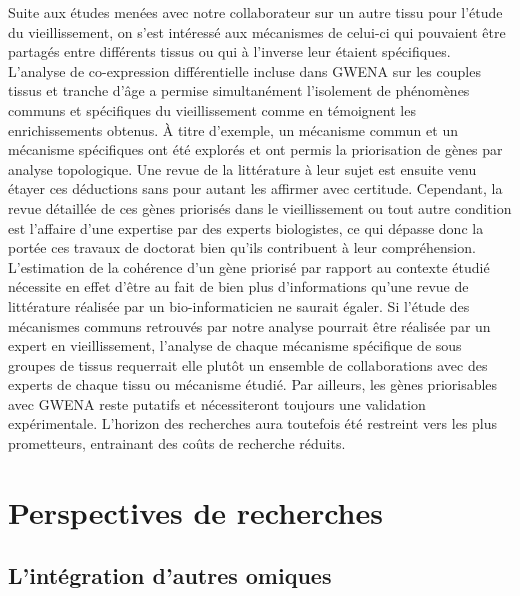 Suite aux études menées avec notre collaborateur sur un autre tissu pour l'étude du vieillissement, on s'est intéressé aux mécanismes de celui-ci qui pouvaient être partagés entre différents tissus ou qui à l'inverse leur étaient spécifiques. L'analyse de co-expression différentielle incluse dans GWENA sur les couples tissus et tranche d'âge a permise simultanément l'isolement de phénomènes communs et spécifiques du vieillissement comme en témoignent les enrichissements obtenus. À titre d'exemple, un mécanisme commun et un mécanisme spécifiques ont été explorés et ont permis la priorisation de gènes par analyse topologique. Une revue de la littérature à leur sujet est ensuite venu étayer ces déductions sans pour autant les affirmer avec certitude. Cependant, la revue détaillée de ces gènes priorisés dans le vieillissement ou tout autre condition est l'affaire d'une expertise par des experts biologistes, ce qui dépasse donc la portée ces travaux de doctorat bien qu'ils contribuent à leur compréhension. L'estimation de la cohérence d'un gène priorisé par rapport au contexte étudié nécessite en effet d'être au fait de bien plus d'informations qu'une revue de littérature réalisée par un bio-informaticien ne saurait égaler. Si l'étude des mécanismes communs retrouvés par notre analyse pourrait être réalisée par un expert en vieillissement, l'analyse de chaque mécanisme spécifique de sous groupes de tissus requerrait elle plutôt un ensemble de collaborations avec des experts de chaque tissu ou mécanisme étudié. Par ailleurs, les gènes priorisables avec GWENA reste putatifs et nécessiteront toujours une validation expérimentale. L'horizon des recherches aura toutefois été restreint vers les plus prometteurs, entrainant des coûts de recherche réduits.



\section{Perspectives de recherches}

\subsection{L'intégration d'autres omiques}

